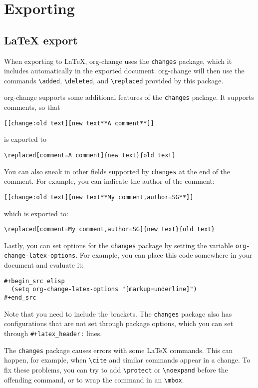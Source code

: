 \documentclass[11pt]{article}
\begin{document}
\section{Exporting}
\label{sec:orgc8f0e92}
\subsection{\LaTeX{} export}
\label{sec:orga5fb52b}

When exporting to \LaTeX{}, org-change uses the \texttt{changes} package, which
it includes automatically in the exported document. org-change will
then use the commands \texttt{\textbackslash{}added}, \texttt{\textbackslash{}deleted}, and \texttt{\textbackslash{}replaced} provided
by this package.

org-change supports some additional features of the \texttt{changes}
package. It supports comments, so that
\begin{verbatim}
[[change:old text][new text**A comment**]]
\end{verbatim}
is exported to
\begin{verbatim}
\replaced[comment=A comment]{new text}{old text}
\end{verbatim}
You can also sneak in other fields supported by \texttt{changes} at the end
of the comment. For example, you can indicate the author of the
comment:
\begin{verbatim}
[[change:old text][new text**My comment,author=SG**]]
\end{verbatim}
which is exported to:
\begin{verbatim}
\replaced[comment=My comment,author=SG]{new text}{old text}
\end{verbatim}
Lastly, you can set options for the \texttt{changes} package by setting the
variable \texttt{org-change-latex-options}. For example, you can place this
code somewhere in your document and evaluate it:
\begin{verbatim}
#+begin_src elisp
  (setq org-change-latex-options "[markup=underline]")
#+end_src
\end{verbatim}
Note that you need to include the brackets. The \texttt{changes} package also
has configurations that are not set through package options, which you
can set through \texttt{\#+latex\_header:} lines.

The \texttt{changes} package causes errors with some \LaTeX{} commands. This can
happen, for example, when \texttt{\textbackslash{}cite} and similar commands appear in a
change. To fix these problems, you can try to add \texttt{\textbackslash{}protect} or
\texttt{\textbackslash{}noexpand} before the offending command, or to wrap the command in an
\texttt{\textbackslash{}mbox}.
\end{document}
